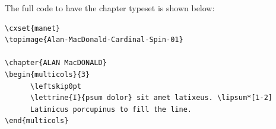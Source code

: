 \def\topimage#1{\cxset{title before={\hskip-2.3cm\texttt{[image: ./chapters/\#1]}\par
\vspace*{\baselineskip}\par}}}




The full code to have the chapter typeset is shown below:


\begin{lstlisting}
\cxset{manet}
\topimage{Alan-MacDonald-Cardinal-Spin-01}

\chapter{ALAN MacDONALD}
\begin{multicols}{3}
      \leftskip0pt
      \lettrine{I}{psum dolor} sit amet latixeus. \lipsum*[1-2]
      Latinicus porcupinus to fill the line.
\end{multicols}
\end{lstlisting}
\lipsum[2]




